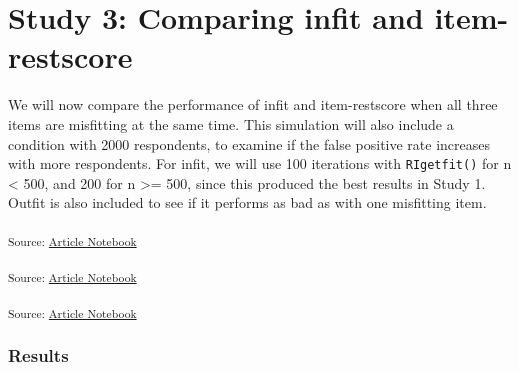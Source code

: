 \documentclass[
  letterpaper,
  DIV=11,
  numbers=noendperiod]{scrartcl}
\begin{document}
\section{Study 3: Comparing infit and
item-restscore}\label{study-3-comparing-infit-and-item-restscore}

We will now compare the performance of infit and item-restscore when all
three items are misfitting at the same time. This simulation will also
include a condition with 2000 respondents, to examine if the false
positive rate increases with more respondents. For infit, we will use
100 iterations with \texttt{RIgetfit()} for n \textless{} 500, and 200
for n \textgreater= 500, since this produced the best results in Study
1. Outfit is also included to see if it performs as bad as with one
misfitting item.

\textsubscript{Source:
\href{https://pgmj.github.io/rasch_itemfit/index.qmd.html}{Article
Notebook}}

\textsubscript{Source:
\href{https://pgmj.github.io/rasch_itemfit/index.qmd.html}{Article
Notebook}}

\textsubscript{Source:
\href{https://pgmj.github.io/rasch_itemfit/index.qmd.html}{Article
Notebook}}

\subsubsection{Results}\label{results-2}
\end{document}
